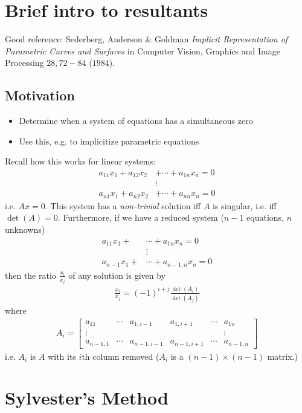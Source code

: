 \section{Brief intro to resultants}
Good reference: Sederberg, Anderson \& Goldman \textit{Implicit
  Representation of Parametric Curves and Surfaces} in Computer
Vision, Graphics and Image Processing $28, 72-84$ ($1984$).

\subsection{Motivation}
\begin{itemize}
\item Determine when a system of equations has a simultaneous zero
\item Use this, e.g. to implicitize parametric equations
\end{itemize}

Recall how this works for linear systems:
\begin{align*}
  a_{11}x_1 + a_{12}x_2 &+ \cdots + a_{1n}x_n = 0 \\
                        &\vdots \\
  a_{n1}x_1 + a_{n2}x_2 &+ \cdots + a_{nn}x_n = 0
\end{align*}
i.e. $Ax = 0$. This system has a \textit{non-trivial} solution iff $A$
is singular, i.e. iff $\det(A) = 0$. Furthermore, if we have a reduced
system ($n-1$ equations, $n$ unknowns)
\begin{align*}
  a_{11}x_1 + &\cdots + a_{1n}x_n = 0 \\
              &\vdots \\
  a_{n-1}x_1 + &\cdots + a_{n-1, n}x_n = 0
\end{align*}
then the ratio $\frac{x_i}{x_j}$ of any solution is given by
\begin{align*}
  \frac{x_i}{x_j} = (-1)^{i+j} \frac{\det(A_i)}{\det(A_j)}
\end{align*}
where
\begin{align*}
  A_i =
  \begin{bmatrix}
    a_{11} &\cdots &a_{1, i-1} &a_{1, i+1} &\cdots &a_{1n} \\
    \vdots&&&&&\vdots \\
    a_{n-1, 1} &\cdots &a_{n-1, i-1} &a_{n-1, i+1} &\cdots &a_{n-1, n}
  \end{bmatrix}
\end{align*}
i.e. $A_i$ is $A$ with its $i$th column removed ($A_i$ is a
$(n-1)\times (n-1)$ matrix.)
\section{Sylvester's Method}



